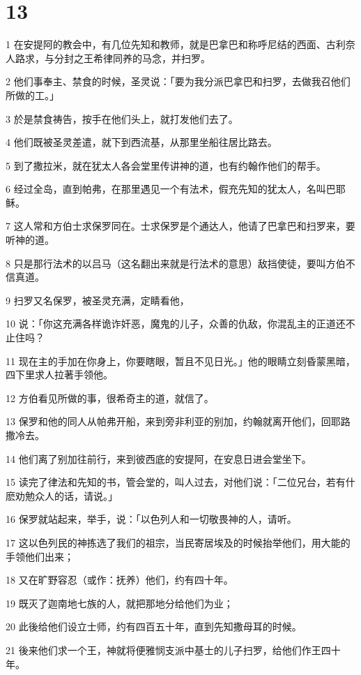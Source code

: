 \chapter{13}

\par 1 在安提阿的教会中，有几位先知和教师，就是巴拿巴和称呼尼结的西面、古利奈人路求，与分封之王希律同养的马念，并扫罗。
\par 2 他们事奉主、禁食的时候，圣灵说：「要为我分派巴拿巴和扫罗，去做我召他们所做的工。」
\par 3 於是禁食祷告，按手在他们头上，就打发他们去了。
\par 4 他们既被圣灵差遣，就下到西流基，从那里坐船往居比路去。
\par 5 到了撒拉米，就在犹太人各会堂里传讲神的道，也有约翰作他们的帮手。
\par 6 经过全岛，直到帕弗，在那里遇见一个有法术，假充先知的犹太人，名叫巴耶稣。
\par 7 这人常和方伯士求保罗同在。士求保罗是个通达人，他请了巴拿巴和扫罗来，要听神的道。
\par 8 只是那行法术的以吕马（这名翻出来就是行法术的意思）敌挡使徒，要叫方伯不信真道。
\par 9 扫罗又名保罗，被圣灵充满，定睛看他，
\par 10 说：「你这充满各样诡诈奸恶，魔鬼的儿子，众善的仇敌，你混乱主的正道还不止住吗？
\par 11 现在主的手加在你身上，你要瞎眼，暂且不见日光。」他的眼睛立刻昏蒙黑暗，四下里求人拉著手领他。
\par 12 方伯看见所做的事，很希奇主的道，就信了。
\par 13 保罗和他的同人从帕弗开船，来到旁非利亚的别加，约翰就离开他们，回耶路撒冷去。
\par 14 他们离了别加往前行，来到彼西底的安提阿，在安息日进会堂坐下。
\par 15 读完了律法和先知的书，管会堂的，叫人过去，对他们说：「二位兄台，若有什麽劝勉众人的话，请说。」
\par 16 保罗就站起来，举手，说：「以色列人和一切敬畏神的人，请听。
\par 17 这以色列民的神拣选了我们的祖宗，当民寄居埃及的时候抬举他们，用大能的手领他们出来；
\par 18 又在旷野容忍（或作：抚养）他们，约有四十年。
\par 19 既灭了迦南地七族的人，就把那地分给他们为业；
\par 20 此後给他们设立士师，约有四百五十年，直到先知撒母耳的时候。
\par 21 後来他们求一个王，神就将便雅悯支派中基士的儿子扫罗，给他们作王四十年。
